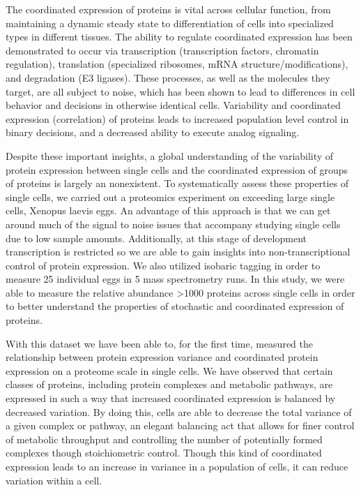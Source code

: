 \documentclass[11pt,]{article}
\begin{document}
The coordinated expression of proteins is vital across cellular
function, from maintaining a dynamic steady state to differentiation of
cells into specialized types in different tissues. The ability to
regulate coordinated expression has been demonstrated to occur via
transcription (transcription factors, chromatin regulation), translation
(specialized ribosomes, mRNA structure/modifications), and degradation
(E3 ligases). These processes, as well as the molecules they target, are
all subject to noise, which has been shown to lead to differences in
cell behavior and decisions in otherwise identical cells. Variability
and coordinated expression (correlation) of proteins leads to increased
population level control in binary decisions, and a decreased ability to
execute analog signaling.

Despite these important insights, a global understanding of the
variability of protein expression between single cells and the
coordinated expression of groups of proteins is largely an nonexistent.
To systematically assess these properties of single cells, we carried
out a proteomics experiment on exceeding large single cells, Xenopus
laevis eggs. An advantage of this approach is that we can get around
much of the signal to noise issues that accompany studying single cells
due to low sample amounts. Additionally, at this stage of development
transcription is restricted so we are able to gain insights into
non-transcriptional control of protein expression. We also utilized
isobaric tagging in order to measure 25 individual eggs in 5 mass
spectrometry runs. In this study, we were able to measure the relative
abundance \textgreater{}1000 proteins across single cells in order to
better understand the properties of stochastic and coordinated
expression of proteins.

With this dataset we have been able to, for the first time, measured the
relationship between protein expression variance and coordinated protein
expression on a proteome scale in single cells. We have observed that
certain classes of proteins, including protein complexes and metabolic
pathways, are expressed in such a way that increased coordinated
expression is balanced by decreased variation. By doing this, cells are
able to decrease the total variance of a given complex or pathway, an
elegant balancing act that allows for finer control of metabolic
throughput and controlling the number of potentially formed complexes
though stoichiometric control. Though this kind of coordinated
expression leads to an increase in variance in a population of cells, it
can reduce variation within a cell.
\end{document}
